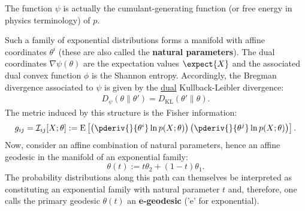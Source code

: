     \begin{remark}
        The function $\psi$ is actually the cumulant-generating function (or free energy in physics terminology) of $p$.
    \end{remark}

    Such a family of exponential distributions forms a manifold with affine coordinates $\theta^i$ (these are also called the \textbf{natural parameters}). The dual coordinates $\nabla\psi(\theta)$ are the expectation values $\expect{X}$ and the associated dual convex function $\phi$ is the Shannon entropy. Accordingly, the Bregman divergence associated to $\psi$ is given by the \underline{dual} Kullback-Leibler divergence:
    \begin{gather}
        \label{info:KL_reversal}
        D_\psi(\theta\|\theta') = D_\mathrm{KL}(\theta'\|\theta).
    \end{gather}
    The metric induced by this structure is the Fisher information:
    \begin{gather}
        g_{ij} = \mathcal{I}_{ij}[X;\theta] := \text{E}\left[\left(\pderiv{}{\theta^i}\ln p(X;\theta)\right)\left(\pderiv{}{\theta^j}\ln p(X;\theta)\right)\right].
    \end{gather}
    Now, consider an affine combination of natural parameters, hence an affine geodesic in the manifold of an exponential family: \[\theta(t) := t\theta_2 + (1-t)\theta_1.\] The probability distributions along this path can themselves be interpreted as constituting an exponential family with natural parameter $t$ and, therefore, one calls the primary geodesic $\theta(t)$ an \textbf{e-geodesic} ('e' for exponential).

